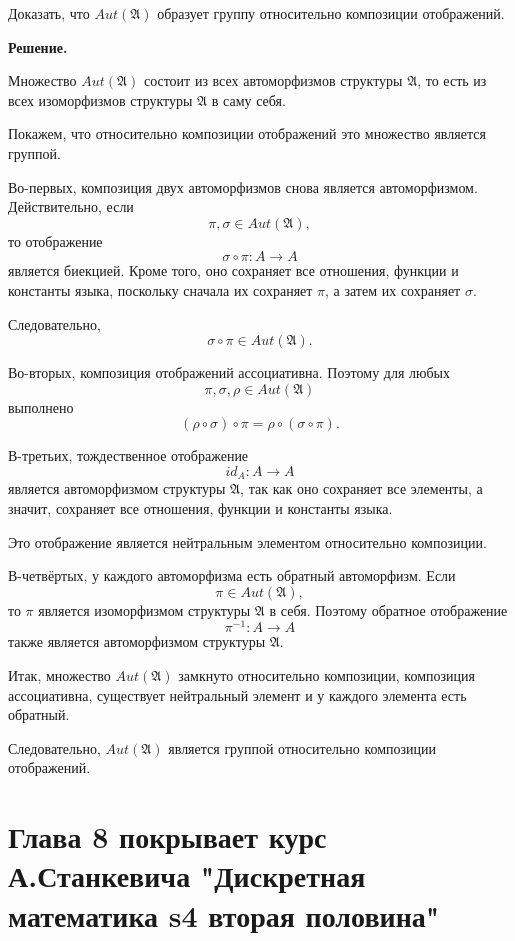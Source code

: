 \documentclass[12pt,a4paper,oneside,openany]{book}
\theoremstyle{definition}
\theoremstyle{plain}
\theoremstyle{remark}
\begin{document}
Доказать, что $Aut(\mathfrak A)$ образует группу относительно композиции отображений.

\par\medskip
\textbf{Решение.}
\par\smallskip

Множество $Aut(\mathfrak A)$ состоит из всех автоморфизмов структуры $\mathfrak A$, то есть из всех изоморфизмов структуры $\mathfrak A$ в саму себя.

Покажем, что относительно композиции отображений это множество является группой.

Во-первых, композиция двух автоморфизмов снова является автоморфизмом. Действительно, если
\[
\pi,\sigma\in Aut(\mathfrak A),
\]
то отображение
\[
\sigma\circ\pi:A\to A
\]
является биекцией. Кроме того, оно сохраняет все отношения, функции и константы языка, поскольку сначала их сохраняет $\pi$, а затем их сохраняет $\sigma$.

Следовательно,
\[
\sigma\circ\pi\in Aut(\mathfrak A).
\]

Во-вторых, композиция отображений ассоциативна. Поэтому для любых
\[
\pi,\sigma,\rho\in Aut(\mathfrak A)
\]
выполнено
\[
(\rho\circ\sigma)\circ\pi=\rho\circ(\sigma\circ\pi).
\]

В-третьих, тождественное отображение
\[
id_A:A\to A
\]
является автоморфизмом структуры $\mathfrak A$, так как оно сохраняет все элементы, а значит, сохраняет все отношения, функции и константы языка.

Это отображение является нейтральным элементом относительно композиции.

В-четвёртых, у каждого автоморфизма есть обратный автоморфизм. Если
\[
\pi\in Aut(\mathfrak A),
\]
то $\pi$ является изоморфизмом структуры $\mathfrak A$ в себя. Поэтому обратное отображение
\[
\pi^{-1}:A\to A
\]
также является автоморфизмом структуры $\mathfrak A$.

Итак, множество $Aut(\mathfrak A)$ замкнуто относительно композиции, композиция ассоциативна, существует нейтральный элемент и у каждого элемента есть обратный.

Следовательно, $Aut(\mathfrak A)$ является группой относительно композиции отображений.


\chapter*{Глава 8 покрывает курс А.Станкевича "Дискретная математика s4 вторая половина"}
\end{document}
